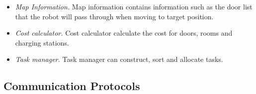 \begin{itemize}
	\item \textsl{Map Information.} Map information contains information such as the door list that the robot will pass through when moving to target position.
	\item \textsl{Cost calculator.} Cost calculator calculate the cost for doors, rooms and charging stations.
	\item \textsl{Task manager.} Task manager can construct, sort and allocate tasks.
\end{itemize}


\subsection{Communication Protocols}
